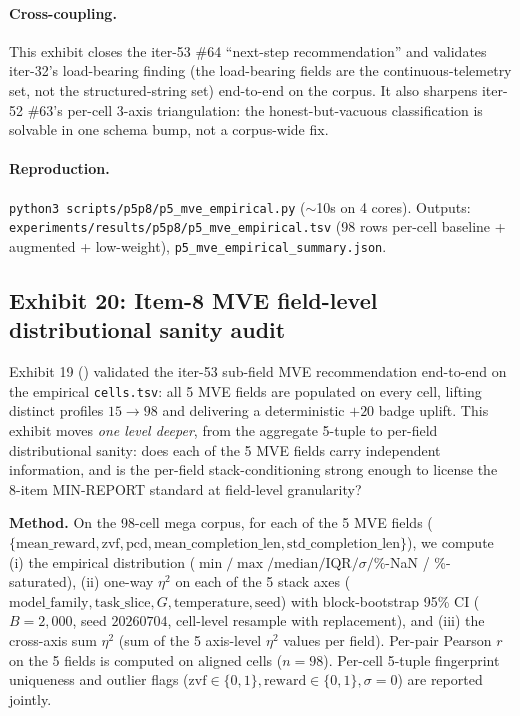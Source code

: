 \paragraph{Cross-coupling.} This exhibit closes the iter-53 \#64
``next-step recommendation'' and validates iter-32's load-bearing
finding (the load-bearing fields are the continuous-telemetry set,
not the structured-string set) end-to-end on the corpus. It also
sharpens iter-52 \#63's per-cell 3-axis triangulation: the
honest-but-vacuous classification is solvable in one schema bump, not
a corpus-wide fix.

\paragraph{Reproduction.}
\texttt{python3 scripts/p5p8/p5\_mve\_empirical.py} ($\sim$10s on 4
cores). Outputs:
\texttt{experiments/results/p5p8/p5\_mve\_empirical.tsv} (98 rows per-cell
baseline + augmented + low-weight),
\texttt{p5\_mve\_empirical\_summary.json}.

\subsection{Exhibit 20: Item-8 MVE field-level distributional sanity audit}
\label{sec:p5-mve-field-audit}

Exhibit 19 () validated the iter-53
sub-field MVE recommendation end-to-end on the empirical \texttt{cells.tsv}:
all 5 MVE fields are populated on every cell, lifting distinct profiles
$15 \rightarrow 98$ and delivering a deterministic $+20$ badge
uplift. This exhibit moves \emph{one level deeper}, from the aggregate
5-tuple to per-field distributional sanity: does each of the 5 MVE
fields carry independent information, and is the per-field
stack-conditioning strong enough to license the 8-item MIN-REPORT
standard at field-level granularity?

\textbf{Method.} On the 98-cell mega corpus, for each of the 5 MVE
fields
($\{\mathrm{mean\_reward}, \mathrm{zvf}, \mathrm{pcd},
\mathrm{mean\_completion\_len}, \mathrm{std\_completion\_len}\}$),
we compute (i) the empirical distribution
($\min / \max / \mathrm{median} / \mathrm{IQR} / \sigma / \%$-NaN /
\%-saturated), (ii) one-way $\eta^2$ on each of the 5 stack axes
($\mathrm{model\_family}, \mathrm{task\_slice}, G,
\mathrm{temperature}, \mathrm{seed}$) with block-bootstrap 95\% CI
($B{=}2{,}000$, seed $20260704$, cell-level resample with
replacement), and (iii) the cross-axis sum $\eta^2$ (sum of the 5
axis-level $\eta^2$ values per field). Per-pair Pearson $r$ on the 5
fields is computed on aligned cells ($n{=}98$). Per-cell 5-tuple
fingerprint uniqueness and outlier flags
($\mathrm{zvf} \in \{0,1\}, \mathrm{reward} \in \{0,1\}, \sigma = 0$)
are reported jointly.

